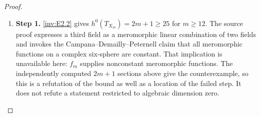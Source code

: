 \begin{proof}
\begin{enumerate}[label={$\langle1\rangle$\arabic*.},leftmargin=*]
\item 
\noindent\textbf{Step 1.} \ref{inv:E2.2} gives $h^0(T_{X_m})=2m+1\ge25$ for $m\ge12$.
The source proof expresses a third field as a meromorphic linear
combination of two fields and invokes the Campana--Demailly--Peternell
claim that all meromorphic functions on a complex six-sphere are
constant. That implication is unavailable here: $f_m$ supplies
nonconstant meromorphic functions. The independently computed
$2m+1$ sections above give the counterexample, so this is a
refutation of the bound as well as a location of the failed step.
It does not refute a statement restricted to algebraic dimension
zero.

\end{enumerate}
\end{proof}
